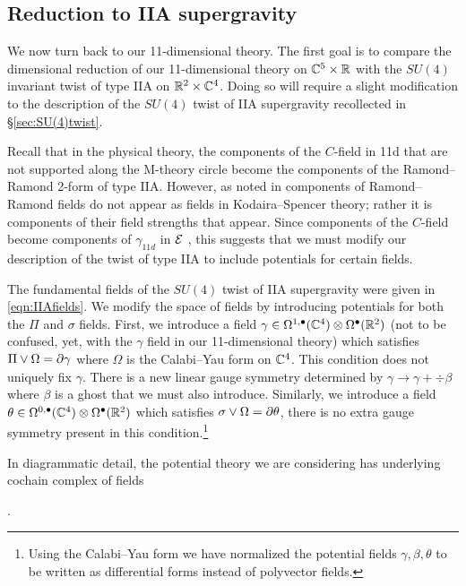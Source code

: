 \subsection{Reduction to IIA supergravity}

We now turn back to our 11-dimensional theory. 
The first goal is to compare the dimensional reduction of our 11-dimensional theory on $\mathbb C^5 \times \mathbb R$
with the $SU(4)$ invariant twist of type IIA on $\mathbb{R}^{2}\times \mathbb C^4$. 
Doing so will require a slight modification to the description of the $SU(4)$ twist of IIA supergravity recollected in \S \ref{sec:SU(4)twist}. 


Recall that in the physical theory, the components of the $C$-field in 11d that are not supported along the M-theory circle become the components of the Ramond--Ramond 2-form of type IIA. However, as noted in \cite{CLSugra} components of Ramond--Ramond fields do not appear as fields in Kodaira--Spencer theory; rather it is components of their field strengths that appear. Since components of the $C$-field become components of $\gamma_{11d}$ in $\mathcal E$ , this suggests that we must modify our description of the twist of type IIA to include potentials for certain fields.

The fundamental fields of the $SU(4)$ twist of IIA supergravity were given in \eqref{eqn:IIAfields}. 
We modify the space of fields by introducing potentials for both the $\Pi$ and $\sigma$ fields. 
First, we introduce a field $\gamma \in \Omega^{1,\bullet}(\mathbb C^4) \otimes \Omega^\bullet(\mathbb R^2)$ (not to be confused, yet, with the $\gamma$ field in our 11-dimensional theory) which satisfies $\Pi \vee \Omega = \partial \gamma$ where $\Omega$ is the Calabi--Yau form on $\mathbb C^4$. 
This condition does not uniquely fix $\gamma$. 
There is a new linear gauge symmetry determined by $\gamma \to \gamma + \div \beta$ where $\beta$ is a ghost that we must also introduce. 
Similarly, we introduce a field $\theta \in \Omega^{0,\bullet}(\mathbb C^4) \otimes \Omega^\bullet(\mathbb R^2)$ which satisfies $\sigma \vee \Omega = \partial \theta$, there is no extra gauge symmetry present in this condition.\footnote{Using the Calabi--Yau form we have normalized the potential fields $\gamma, \beta,\theta$ to be written as differential forms instead of polyvector fields.}

In diagrammatic detail, the potential theory we are considering has underlying cochain complex of fields
\beqn\label{eqn:IIApot}
\eeqn.

